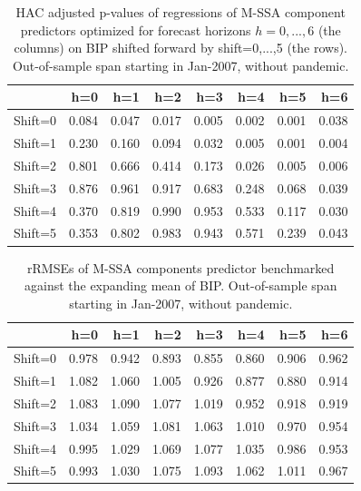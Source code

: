 \documentclass[a4paper]{article}
\begin{document}
\begin{table}[ht]
\centering
\begin{tabular}{rrrrrrrr}
  \hline
 & h=0 & h=1 & h=2 & h=3 & h=4 & h=5 & h=6 \\ 
  \hline
Shift=0 & 0.084 & 0.047 & 0.017 & 0.005 & 0.002 & 0.001 & 0.038 \\ 
  Shift=1 & 0.230 & 0.160 & 0.094 & 0.032 & 0.005 & 0.001 & 0.004 \\ 
  Shift=2 & 0.801 & 0.666 & 0.414 & 0.173 & 0.026 & 0.005 & 0.006 \\ 
  Shift=3 & 0.876 & 0.961 & 0.917 & 0.683 & 0.248 & 0.068 & 0.039 \\ 
  Shift=4 & 0.370 & 0.819 & 0.990 & 0.953 & 0.533 & 0.117 & 0.030 \\ 
  Shift=5 & 0.353 & 0.802 & 0.983 & 0.943 & 0.571 & 0.239 & 0.043 \\ 
   \hline
\end{tabular}
\caption{HAC adjusted p-values of regressions of M-SSA component predictors optimized for forecast horizons $h=0,...,6$  (the columns) on BIP shifted forward by shift=0,...,5 (the rows). Out-of-sample span starting in Jan-2007, without pandemic.} 
\label{p_val_wc5}
\end{table}%
\begin{table}[ht]
\centering
\begin{tabular}{rrrrrrrr}
  \hline
 & h=0 & h=1 & h=2 & h=3 & h=4 & h=5 & h=6 \\ 
  \hline
Shift=0 & 0.978 & 0.942 & 0.893 & 0.855 & 0.860 & 0.906 & 0.962 \\ 
  Shift=1 & 1.082 & 1.060 & 1.005 & 0.926 & 0.877 & 0.880 & 0.914 \\ 
  Shift=2 & 1.083 & 1.090 & 1.077 & 1.019 & 0.952 & 0.918 & 0.919 \\ 
  Shift=3 & 1.034 & 1.059 & 1.081 & 1.063 & 1.010 & 0.970 & 0.954 \\ 
  Shift=4 & 0.995 & 1.029 & 1.069 & 1.077 & 1.035 & 0.986 & 0.953 \\ 
  Shift=5 & 0.993 & 1.030 & 1.075 & 1.093 & 1.062 & 1.011 & 0.967 \\ 
   \hline
\end{tabular}
\caption{rRMSEs of M-SSA components predictor benchmarked against the expanding mean of BIP. Out-of-sample span starting in Jan-2007, without pandemic.} 
\label{rRMSE_mSSA_comp_mean6}
\end{table}%
\end{document}
